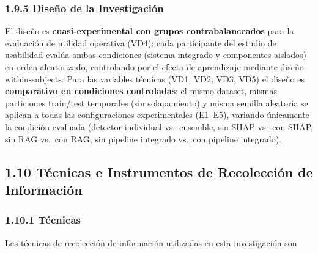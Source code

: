 \subsubsection{1.9.5 Diseño de la
Investigación}\label{diseuxf1o-de-la-investigaciuxf3n}

El diseño es \textbf{cuasi-experimental con grupos contrabalanceados}
para la evaluación de utilidad operativa (VD4): cada participante del
estudio de usabilidad evalúa ambas condiciones (sistema integrado y
componentes aislados) en orden aleatorizado, controlando por el efecto
de aprendizaje mediante diseño within-subjects. Para las variables
técnicas (VD1, VD2, VD3, VD5) el diseño es \textbf{comparativo en
condiciones controladas}: el mismo dataset, mismas particiones
train/test temporales (sin solapamiento) y misma semilla aleatoria se
aplican a todas las configuraciones experimentales (E1--E5), variando
únicamente la condición evaluada (detector individual vs.~ensemble, sin
SHAP vs.~con SHAP, sin RAG vs.~con RAG, sin pipeline integrado vs.~con
pipeline integrado).

\subsection{1.10 Técnicas e Instrumentos de Recolección de
Información}\label{tuxe9cnicas-e-instrumentos-de-recolecciuxf3n-de-informaciuxf3n}

\subsubsection{1.10.1 Técnicas}\label{tuxe9cnicas}

Las técnicas de recolección de información utilizadas en esta
investigación son:

